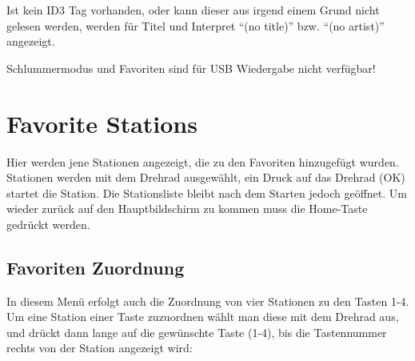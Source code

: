 \documentclass[12pt,a4paper,openany]{memoir}
\begin{document}

Ist kein ID3 Tag vorhanden, oder kann dieser aus irgend einem Grund nicht gelesen werden, werden für Titel und Interpret ``(no title)'' bzw. ``(no artist)'' angezeigt.



Schlummermodus und Favoriten sind für USB Wiedergabe nicht verfügbar!



\section{Favorite Stations}
Hier werden jene Stationen angezeigt, die zu den Favoriten hinzugefügt wurden. Stationen werden mit dem Drehrad ausgewählt, ein Druck auf das Drehrad (OK) startet die Station. 
Die Stationsliste bleibt nach dem Starten jedoch geöffnet. Um wieder zurück auf den Hauptbildschirm zu kommen muss die Home-Taste gedrückt werden. 


\subsection{Favoriten Zuordnung}
In diesem Menü erfolgt auch die Zuordnung von vier Stationen zu den Tasten 1-4. Um eine Station einer Taste zuzuordnen wählt man diese mit dem Drehrad aus, und drückt dann lange auf die 
gewünschte Taste (1-4), bis die Tastennummer rechts von der Station angezeigt wird:

\end{document}
